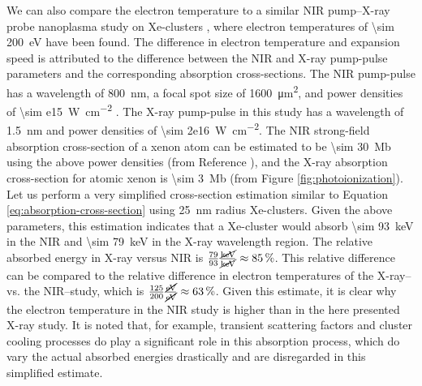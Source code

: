 We can also compare the electron temperature to a similar NIR pump--X-ray probe nanoplasma study on Xe-clusters \cite{Gorkhover-2016-NatPho}, where electron temperatures of \SI{\sim 200}{\electronvolt} have been found. The difference in electron temperature and expansion speed is attributed to the difference between the NIR and X-ray pump-pulse parameters and the corresponding absorption cross-sections. The NIR pump-pulse has a wavelength of \SI{800}{\nano\meter}, a focal spot size of \SI{1600}{\micro\meter\squared}, and power densities of \SI{\sim e15}{\watt\per\square\centi\meter} \cite{Gorkhover-2016-NatPho}. The X-ray pump-pulse in this study has a wavelength of \SI{1.5}{\nano\meter} and power densities of \SI{\sim 2e16}{\watt\per\square\centi\meter}. The NIR strong-field absorption cross-section of a xenon atom can be estimated to be \SI{\sim 30}{\mega\barn} using the above power densities (from Reference \cite[][1826]{Fennel-2010-RMP}), and the X-ray absorption cross-section for atomic xenon is \SI{\sim 3}{\mega\barn} (from Figure \ref{fig:photoionization}). Let us perform a very simplified cross-section estimation similar to Equation \eqref{eq:absorption-cross-section} using \SI{25}{\nano\meter} radius Xe-clusters. Given the above parameters, this estimation indicates that a Xe-cluster would absorb \SI{\sim 93}{\kilo\electronvolt} in the NIR and \SI{\sim 79}{\kilo\electronvolt} in the X-ray wavelength region. The relative absorbed energy in X-ray versus NIR is $\tfrac{79}{93}\si[per-mode = fraction]{\cancel\kilo\electronvolt\per\cancel\kilo\electronvolt}\approx\SI{85}{\percent}$. This relative difference can be compared to the relative difference in electron temperatures of the X-ray-- vs. the NIR--study, which is $\tfrac{125}{200}\si[per-mode = fraction]{\cancel\electronvolt\per\cancel\electronvolt}\approx\SI{63}{\percent}$. Given this estimate, it is clear why the electron temperature in the NIR study is higher than in the here presented X-ray study. It is noted that, for example, transient scattering factors and cluster cooling processes \cite{Fennel-2010-RMP} do play a significant role in this absorption process, which do vary the actual absorbed energies drastically \cite{Fennel-2010-RMP} and are disregarded in this simplified estimate.\\[1\baselineskip]
